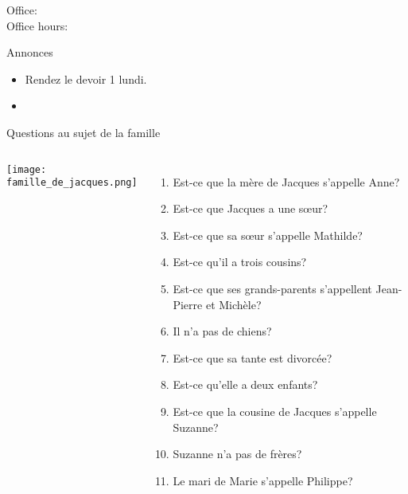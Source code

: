 \documentclass{beamer}
\subtitle[Oui ou non]{Les questions oui ou non}
\begin{document}
  \begin{frame}
    \titlepage
    \tiny{Office: \\
          Office hours: }
  \end{frame}

  \begin{frame}{Annonces}
    \begin{itemize}
      \item Rendez le devoir 1 lundi.
      \item[] 
    \end{itemize}
  \end{frame}

  \begin{frame}{Questions au sujet de la famille}
    \begin{columns}[T]
        \texttt{[image: famille\_de\_jacques.png]}
        {\scriptsize
          \begin{enumerate}
            \item Est-ce que la mère de Jacques s'appelle Anne?
            \item Est-ce que Jacques a une sœur?
            \item Est-ce que sa sœur s'appelle Mathilde?
            \item Est-ce qu'il a trois cousins?
            \item Est-ce que ses grands-parents s'appellent Jean-Pierre et Michèle?
            \item Il n'a pas de chiens?
            \item Est-ce que sa tante est divorcée?
            \item Est-ce qu'elle a deux enfants?
            \item Est-ce que la cousine de Jacques s'appelle Suzanne?
            \item Suzanne n'a pas de frères?
            \item Le mari de Marie s'appelle Philippe?
          \end{enumerate}
        }
    \end{columns}
  \end{frame}
\end{document}
